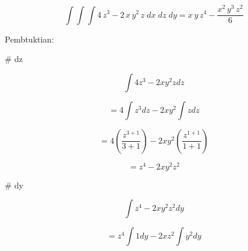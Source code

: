 \documentclass[a4paper,10pt]{article}
\begin{document}
\begin{eulernotebook}
\begin{eulercomment}
\begin{eulercomment}
\begin{eulercomment}
\begin{eulercomment}
\begin{eulercomment}
\begin{eulercomment}
\begin{eulercomment}
\begin{eulercomment}
\begin{eulercomment}
\begin{eulercomment}
\begin{eulercomment}
\begin{eulercomment}
\begin{eulerprompt}
\end{eulerprompt}
\begin{eulerformula}
\[
\int {\int {\int {4\,z^3-2\,x\,y^2\,z}{\;dx}}{\;dz}}{\;dy}=x\,y\,z^  4-\frac{x^2\,y^3\,z^2}{6}
\]
\end{eulerformula}
\begin{eulerttcomment}
   Pembtuktian:
\end{eulerttcomment}
\begin{eulercomment}
\end{eulercomment}
\begin{eulerttcomment}
 # dz
\end{eulerttcomment}
\begin{eulercomment}
\end{eulercomment}
\begin{eulerformula}
\[
\int 4z^3 - 2xy^2z dz
\]
\end{eulerformula}
\begin{eulercomment}
\end{eulercomment}
\begin{eulerformula}
\[
= 4 \int z^3 dz - 2xy^2 \int  z dz
\]
\end{eulerformula}
\begin{eulercomment}
\end{eulercomment}
\begin{eulerformula}
\[
= 4 (\frac {z^{3+1}} {3+1}) - 2xy^2 (\frac {z^{1+1}} {1+1})
\]
\end{eulerformula}
\begin{eulercomment}
\end{eulercomment}
\begin{eulerformula}
\[
= z^4 - 2xy^2z^2
\]
\end{eulerformula}
\begin{eulercomment}
\end{eulercomment}
\begin{eulerttcomment}
 # dy
\end{eulerttcomment}
\begin{eulercomment}
\end{eulercomment}
\begin{eulerformula}
\[
\int z^4 - 2xy^2z^2 dy
\]
\end{eulerformula}
\begin{eulercomment}
\end{eulercomment}
\begin{eulerformula}
\[
= z^4 \int 1 dy - 2xz^2 \int y^2 dy
\]
\end{eulerformula}
\begin{eulercomment}

\end{eulercomment}
\end{eulercomment}
\end{eulercomment}
\end{eulercomment}
\end{eulercomment}
\end{eulercomment}
\end{eulercomment}
\end{eulercomment}
\end{eulercomment}
\end{eulercomment}
\end{eulercomment}
\end{eulercomment}
\end{eulercomment}
\end{eulernotebook}
\end{document}

